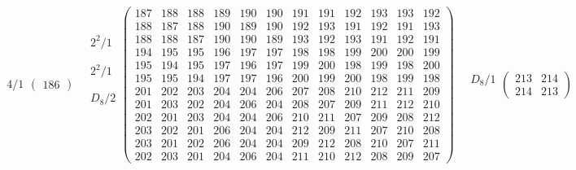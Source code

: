 \documentclass[11pt,a4paper]{amsart}
\begin{document}
\begin{align*}
\begin{array}{c}
4/1
\end{array}
\left(
\begin{array}{r}
186
\end{array}
\right)
\quad
  \begin{array}{c}
    2^2/1 \\
\\
\\ \hline
    2^2/1 \\
\\
\\ \hline
D_8/2 \\
\\
\\
\\
\\
\\
  \end{array}
\left(
\begin{array}{rrr|rrr|rrrrrr}
187&188&188&189&190&190&191&191&192&193&193&192\\%
188&187&188&190&189&190&192&193&191&192&191&193\\%
188&188&187&190&190&189&193&192&193&191&192&191\\\hline
194&195&195&196&197&197&198&198&199&200&200&199\\%
195&194&195&197&196&197&199&200&198&199&198&200\\%
195&195&194&197&197&196&200&199&200&198&199&198\\\hline
201&202&203&204&204&206&207&208&210&212&211&209\\%
201&203&202&204&206&204&208&207&209&211&212&210\\%
202&201&203&204&204&206&210&211&207&209&208&212\\%
203&202&201&206&204&204&212&209&211&207&210&208\\%
203&201&202&206&204&204&209&212&208&210&207&211\\%
202&203&201&204&206&204&211&210&212&208&209&207
\end{array}
\right)
\quad
\begin{array}{c}
D_8/1 \\
\\
\end{array}
\left(
\begin{array}{rr}
213&214\\%
214&213
\end{array}%
\right)
\end{align*}
\end{document}
